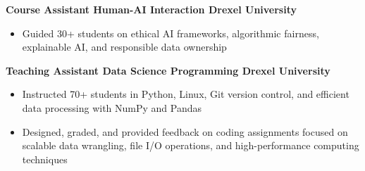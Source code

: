 \documentclass[10pt]{article}
\begin{document}
\noindent
\textbf{Course Assistant \textbar{} Human-AI Interaction \textbar{} \textbf{Drexel University }} \\
\vspace{-0.4cm}
\begin{itemize}[leftmargin=0.6cm, itemsep=-0.1cm, topsep=0cm]

    \item Guided 30+ students on ethical AI frameworks, algorithmic fairness, explainable AI, and responsible data ownership

\end{itemize}

\noindent
\textbf{Teaching Assistant \textbar{} Data Science Programming \textbar{} \textbf{Drexel University }} \\
\vspace{-0.4cm}
\begin{itemize}[leftmargin=0.6cm, itemsep=-0.1cm, topsep=0cm]

    \item Instructed 70+ students in Python, Linux, Git version control, and efficient data processing with NumPy and Pandas

    \item Designed, graded, and provided feedback on coding assignments focused on scalable data wrangling, file I/O operations, and high-performance computing techniques

\end{itemize}
\end{document}
